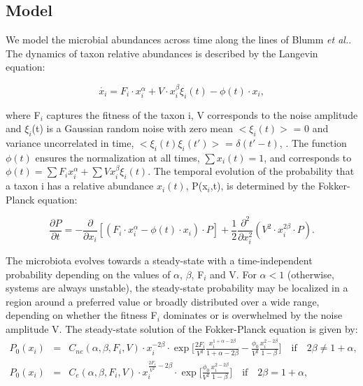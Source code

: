 \subsection*{Model} \label{sec:model}

We model the microbial abundances across time along the lines of Blumm \textit{et al.}\cite{ranking}. The dynamics of taxon relative abundances is described by the Langevin equation:
\begin{linenomath}
\begin{equation*}
\dot{x_i} = F_i \cdot x_i^\alpha + V \cdot x_i^\beta \xi_i(t) - \phi(t) \cdot x_i,
\end{equation*}
\end{linenomath}
where F$_i$ captures the fitness of the taxon i, V corresponds to the noise amplitude and $\xi_i$(t) is a Gaussian random noise with zero mean  $<\xi_i(t)>$ = 0 and variance uncorrelated in time, $<\xi_i(t) \xi_i(t')>$ =  $\delta(t'-t)$, . The function $\phi(t)$ ensures the normalization at all times, $\sum x_i(t) = 1$, and corresponds to $\phi(t) = \sum F_i x_i^\alpha + \sum V x_i^\beta \xi_i(t)$.
The temporal evolution of the probability that a taxon i has a relative abundance $x_i(t)$, P(x$_i$,t), is determined by the Fokker-Planck equation:
\begin{linenomath}
\begin{equation*}
\frac{\partial P}{\partial t} = - \frac{\partial}{\partial x_i}  [(F_i \cdot x_i^\alpha - \phi(t) \cdot x_i ) \cdot P]+ \frac{1}{2} \frac{\partial^2}{\partial x_i^2} (V^2 \cdot x_i^{2\beta}\cdot P).
\end{equation*}
\end{linenomath}
The microbiota evolves towards a steady-state with a time-independent probability depending on the values of $\alpha$, $\beta$, F$_i$ and V. For $\alpha<1$ (otherwise, systems are always unstable), the steady-state probability may be localized in a region around a preferred value or broadly distributed over a wide range, depending on whether the fitness F$_i$  dominates or is overwhelmed by the noise amplitude V. The steady-state solution of the Fokker-Planck equation is given by:
\begin{eqnarray*}
P_0 (x_i) &=& C_{ne}(\alpha,\beta,F_i,V)  \cdot x_i^{-2\beta}  \cdot \exp\Big[\frac{2F_i}{V^2}\frac{x_i^{1+\alpha-2\beta}}{1+\alpha-2\beta}-\frac{\phi_0}{V^2}\frac{x_i^{2-2\beta}}{1-\beta}\Big] \quad \textrm{if} \quad  2\beta \ne 1+\alpha, \\
P_0 (x_i) &=& C_e(\alpha,\beta,F_i,V)  \cdot x_i^{\frac{2F_i}{V^2} -2\beta}  \cdot \exp\Big[\frac{\phi_0}{V^2}\frac{x_i^{2-2\beta}}{1-\beta}\Big] \quad \textrm{if} \quad  2\beta = 1+\alpha,
\end{eqnarray*}

